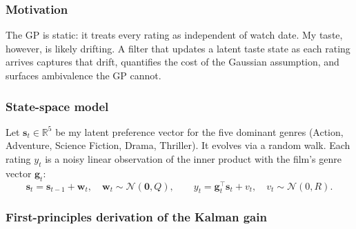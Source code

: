 \documentclass{article}
\begin{document}
\subsubsection*{Motivation}

The GP is static: it treats every rating as independent of watch date. My taste, however, is likely drifting. A filter that updates a latent taste state as each rating arrives captures that drift, quantifies the cost of the Gaussian assumption, and surfaces ambivalence the GP cannot.

\subsubsection*{State-space model}

Let $\mathbf{s}_t \in \mathbb{R}^5$ be my latent preference vector for the five dominant genres (Action, Adventure, Science Fiction, Drama, Thriller). It evolves via a random walk. Each rating $y_t$ is a noisy linear observation of the inner product with the film's genre vector $\mathbf{g}_t$:
\begin{equation}
\mathbf{s}_t = \mathbf{s}_{t-1} + \mathbf{w}_t, \quad \mathbf{w}_t \sim \mathcal{N}(\mathbf{0}, Q), \qquad y_t = \mathbf{g}_t^\top \mathbf{s}_t + v_t, \quad v_t \sim \mathcal{N}(0, R).
\label{eq:ssm}
\end{equation}

\subsubsection*{First-principles derivation of the Kalman gain}
\end{document}
